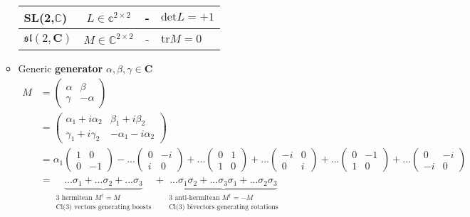 \documentclass[../main.tex]{subfiles}
\begin{document}
\begin{itemize}
\begin{itemize}
\begin{center}
\begin{tabular}{|l|c|c|l|}
\hline
SL(2,$\mathbb{C}$)   & $L\in\mathbb{c}^{2\times2}$ & - & $\text{det}L=+1$ \\ \hline
$\mathfrak{sl}(2,\mathbf{C})$ & $M\in\mathbb{C}^{2\times2} $ & - & $\text{tr} M=0$ \\ \hline
\end{tabular}
\end{center}
\item Generic {\bf generator} $\alpha,\beta,\gamma\in \mathbf{C}$
\begin{align}
M
&=\left(
\begin{matrix}
\alpha & \beta\\
\gamma & -\alpha
\end{matrix}
\right)\\
&=\left(
\begin{matrix}
\alpha_1+i\alpha_2 & \beta_1+i\beta_2 \\
\gamma_1+i\gamma_2  & -\alpha_1-i\alpha_2 
\end{matrix}
\right)\\
&=
\alpha_1\left(
\begin{matrix}
1 & 0 \\
0 & -1 
\end{matrix}
\right)
-...\left(
\begin{matrix}
0 & -i \\
i & 0 
\end{matrix}
\right)
+...\left(
\begin{matrix}
0 & 1 \\
1 & 0 
\end{matrix}
\right)
+...\left(
\begin{matrix}
-i & 0 \\
0 & i 
\end{matrix}
\right)
+...\left(
\begin{matrix}
0 & -1 \\
1 & 0 
\end{matrix}
\right)
+...\left(
\begin{matrix}
0 & -i \\
-i & 0 
\end{matrix}
\right)\\
%
&=\underbrace{
...\sigma_1
+...\sigma_2
+...\sigma_3}_{\substack{\text{3 hermitean } M^\dagger=M\\ \text{Cl(3) vectors generating boosts}}}
+\underbrace{...\sigma_1\sigma_2
+...\sigma_3\sigma_1
+...\sigma_2\sigma_3}_{\substack{\text{3 anti-hermitean } M^\dagger=-M\\ \text{Cl(3) bivectors generating rotations}}}

\end{align}
\end{itemize}
\end{itemize}
\end{document}
